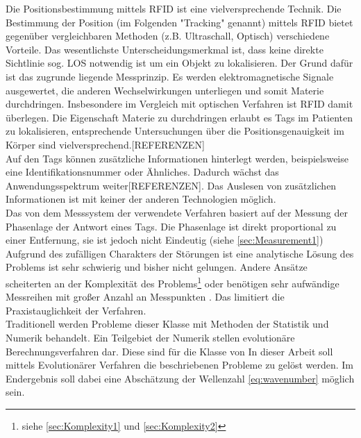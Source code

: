 Die Positionsbestimmung mittels RFID ist eine vielversprechende Technik. Die Bestimmung der Position (im Folgenden "Tracking" genannt) mittels RFID  bietet gegenüber vergleichbaren Methoden (z.B. Ultraschall, Optisch) verschiedene Vorteile. Das wesentlichste Unterscheidungsmerkmal ist, dass keine direkte Sichtlinie sog. LOS notwendig ist um ein Objekt zu lokalisieren. Der Grund dafür ist das zugrunde liegende Messprinzip. Es werden elektromagnetische Signale ausgewertet, die anderen Wechselwirkungen unterliegen und somit Materie durchdringen. Insbesondere im Vergleich mit optischen Verfahren ist RFID damit überlegen. Die Eigenschaft Materie zu durchdringen erlaubt es Tags im Patienten zu lokalisieren, entsprechende Untersuchungen über die Positionsgenauigkeit im Körper sind vielversprechend.[REFERENZEN]\\
Auf den Tags können zusätzliche Informationen hinterlegt werden, beispielsweise eine Identifikationsnummer oder Ähnliches. Dadurch wächst das Anwendungsspektrum weiter[REFERENZEN]. Das Auslesen von zusätzlichen Informationen ist mit keiner der anderen Technologien möglich.\\
%
Das von dem Messsystem der \amedogmbh verwendete Verfahren basiert auf der Messung der Phasenlage der Antwort eines Tags. Die Phasenlage ist direkt proportional zu einer Entfernung, sie ist jedoch nicht Eindeutig (siehe \ref{sec:Measurement1})\\
%
Aufgrund des zufälligen Charakters der Störungen ist eine analytische Lösung des Problems ist sehr schwierig und bisher nicht gelungen. Andere Ansätze scheiterten an der Komplexität des Problems\footnote{siehe \ref{sec:Komplexity1} und \ref{sec:Komplexity2}} oder benötigen sehr aufwändige Messreihen mit großer Anzahl an Messpunkten \cite{amedo1}. Das limitiert die Praxistauglichkeit der Verfahren.\\
%
Traditionell werden Probleme dieser Klasse mit Methoden der Statistik und Numerik behandelt. Ein Teilgebiet der Numerik stellen evolutionäre Berechnungsverfahren dar. Diese sind für die Klasse von 
%
In dieser Arbeit soll mittels Evolutionärer Verfahren die beschriebenen Probleme zu gelöst werden. Im Endergebnis soll dabei eine Abschätzung der Wellenzahl \ref{eq:wavenumber} möglich sein.%
